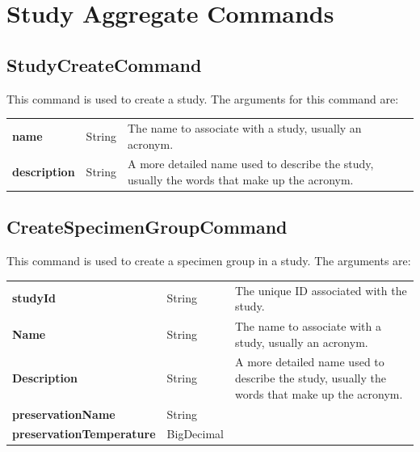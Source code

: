 \section {Study Aggregate Commands}

\subsection{StudyCreateCommand}

This command is used to create a study. The arguments for this command are:

\vspace{6pt}
\begin{tabularx}{\textwidth}{@{} >{\bfseries}l l X }

  name & String & The name to associate with a study, usually an acronym.\\

  description & String & A more detailed name used to describe the study,
  usually the words that make up the acronym.\\

\end{tabularx}

\subsection{CreateSpecimenGroupCommand}

This command is used to create a specimen group in a study. The arguments are:

\vspace{6pt}
\begin{tabularx}{\textwidth}{@{} >{\bfseries}l l X }

  studyId & String & The unique ID associated with the study.\\

  Name & String & The name to associate with a study, usually an acronym.\\

  Description & String & A more detailed name used to describe the study, usually
    the words that make up the acronym. \\

  preservationName & String & \\

  preservationTemperature & BigDecimal & \\

\end{tabularx}
